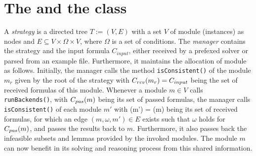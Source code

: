 \section{The \managerClass and the \strategyClass class} A
\emph{strategy} is a directed tree $T:=(V, E)$ with a set $V$ of
module (instances) as nodes and $E\subseteq V\times \Omega\times V$,
where $\Omega$ is a set of conditions. The \emph{manager} contains the
strategy and the input formula $C_{input}$, either received by a prefexed solver
or parsed from an example file. Furthermore, it maintains the
allocation of module as follows. Initially, the manager calls the method
\texttt{isConsistent()} of the module $m_r$ given by the root of
the strategy with $C_{rcv}(m_r) = C_{input}$ being the set of received formulas of this
module. Whenever a module $m\in V$ calls
\texttt{runBackends()}, with $C_{pas}(m)$ being its set of passed
formulas, the manager calls \texttt{isConsistent()} of each module
$m'$ with \Crcv(m') = \Cpass(m) being its set of received formulas, for which
an edge $(m, \omega, m')\in E$ exists such that $\omega$ holds for
$C_{pas}(m)$, and passes the results back to $m$. Furthermore, it also
passes back the infeasible subsets and lemmas provided by the invoked
modules. The module $m$ can now benefit in its solving and reasoning
process from this shared information.


